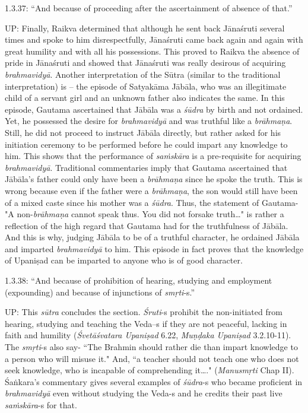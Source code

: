 1.3.37: “And because of proceeding after the ascertainment of absence of that.”


UP: Finally, Raikva determined that although he sent back Jānaśruti several times and spoke to him disrespectfully, Jānaśruti came back again and again with great humility and with all his possessions. This proved to Raikva the absence of pride in Jānaśruti and showed that Jānaśruti was really desirous of acquiring \textit{brahmavidyā}. Another interpretation of the Sūtra (similar to the traditional interpretation) is – the episode of Satyakāma Jābāla, who was an illegitimate child of a servant girl and an unknown father also indicates the same. In this episode, Gautama ascertained that Jābāla was a \textit{śūdra} by birth and not ordained. Yet, he possessed the desire for \textit{brahmavidyā} and was truthful like a \textit{brāhmaṇa}. Still, he did not proceed to instruct Jābāla directly, but rather asked for his initiation ceremony to be performed before he could impart any knowledge to him. This shows that the performance of \textit{saṁskāra} is a pre-requisite for acquiring \textit{brahmavidyā}. Traditional commentaries imply that Gautama ascertained that Jābāla's father could only have been a \textit{brāhmaṇa} since he spoke the truth. This is wrong because even if the father were a \textit{brāhmaṇa}, the son would still have been of a mixed caste since his mother was a \textit{śūdra}. Thus, the statement of Gautama- "A non-\textit{brāhmaṇa} cannot speak thus. You did not forsake truth…" is rather a reflection of the high regard that Gautama had for the truthfulness of Jābāla. And this is why, judging Jābāla to be of a truthful character, he ordained Jābāla and imparted \textit{brahmavidyā} to him. This episode in fact proves that the knowledge of Upaniṣad can be imparted to anyone who is of good character.

1.3.38: “And because of prohibition of hearing, studying and employment (expounding) and because of injunctions of \textit{smṛti}-s.”

UP: This \textit{sūtra} concludes the section. \textit{Śruti}-s prohibit the non-initiated from hearing, studying and teaching the Veda--s if they are not peaceful, lacking in faith and humility (\textit{Śvetāśvatara Upaniṣad} 6.22, \textit{Muṇḍaka Upaniṣad} 3.2.10-11). The \textit{smṛti}-s also say- ``The Brahmin should rather die than impart knowledge to a person who will misuse it." And, “a teacher should not teach one who does not seek knowledge, who is incapable of comprehending it…." (\textit{Manusmṛti} Chap II). Śaṅkara’s commentary gives several examples of \textit{śūdra}-s who became proficient in \textit{brahmavidyā} even without studying the Veda-s and he credits their past live \textit{saṁskāra}-s for that.


